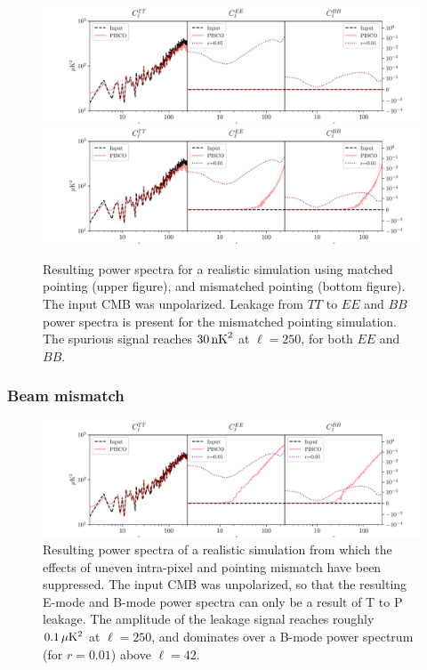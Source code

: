 \documentclass[a4paper,11pt]{article}
\begin{document}
\begin{figure}
    \centering
    \includegraphics[width=1\textwidth]{figures/unpol.pdf}
    \includegraphics[width=1\textwidth]{figures/pointingMismatch.pdf}
	\caption{Resulting power spectra for a realistic simulation using matched pointing (upper figure), and mismatched pointing (bottom figure). The input CMB was unpolarized. Leakage from $TT$ to $EE$ and $BB$ power spectra is present for the mismatched pointing simulation. The spurious signal reaches $30\, \rm{nK}^2$ at $\ell = 250$, for both $EE$ and $BB$.}
	\label{fig::pisco4class_pointingmismatch}
\end{figure}

\subsubsection{Beam mismatch}

\begin{figure}
	\centering
	\includegraphics[width=1\textwidth]{figures/beamMismatch.pdf}
	\caption{Resulting power spectra of a realistic simulation from which the effects of uneven intra-pixel and pointing mismatch have been suppressed. The input CMB was unpolarized, so that the resulting E-mode and B-mode power spectra can only be a result of T to P leakage. The amplitude of the leakage signal reaches roughly $0.1\, \mu\rm{K}^2$ at $\ell=250$, and dominates over a B-mode power spectrum (for $r=0.01$) above $\ell=42$.}
	\label{fig::pisco4class_beammismatch}
\end{figure}
\end{document}

